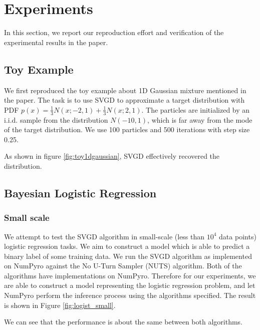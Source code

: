 \section{Experiments}
In this section, we report our reproduction effort and verification of the experimental results in the paper.

\subsection{Toy Example}


We first reproduced the toy example about 1D Gaussian mixture mentioned in the paper. The task is to use SVGD to approximate a target distribution with PDF $p(x) = \frac{1}{3} N(x; -2, 1) + \frac{1}{3} N(x; 2, 1)$. The particles are initialized by an i.i.d. sample from the distribution $N(-10, 1)$, which is far away from the mode of the target distribution. We use 100 particles and 500 iterations with step size 0.25. 

As shown in figure \ref{fig:toy1dgaussian}, SVGD effectively recovered the distribution.





\subsection{Bayesian Logistic Regression}
\subsubsection{Small scale}
We attempt to test the SVGD algorithm in small-scale (less than $10^4$ data points) logistic regression tasks. We aim to construct a model which is able to predict a binary label of some training data. We run the SVGD algorithm as implemented on NumPyro against the No U-Turn Sampler (NUTS) algorithm. Both of the algorithms have implementations on NumPyro. Therefore for our experiments, we are able to construct a model representing the logistic regression problem, and let NumPyro perform the inference process using the algorithms specified. The result is shown in Figure \ref{fig:logist_small}.

We can see that the performance is about the same between both algorithms. 

